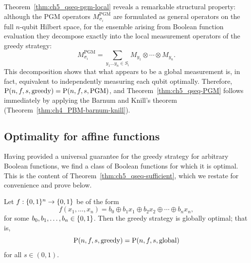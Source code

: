 Theorem~\ref{thm:ch5_qseq-pgm-local} reveals a remarkable structural property: although the PGM operators $M_{\sigma_i}^{\text{PGM}}$ are formulated as general operators on the full $n$-qubit Hilbert space, for the ensemble arising from Boolean function evaluation they decompose exactly into the local measurement operators of the greedy strategy:
\begin{equation}
    M_{\sigma_i}^{\text{PGM}} = \sum_{y_1 \ldots y_n \in S_i} M_{y_1} \otimes \cdots \otimes M_{y_n}.
\end{equation}
This decomposition shows that what appears to be a global measurement is, in fact, equivalent to independently measuring each qubit optimally.
Therefore, \\ $\operatorname{P}(n,f,s,\mathrm{greedy}) = \operatorname{P}(n,f,s,\mathrm{PGM})$, and Theorem~\ref{thm:ch5_qseq-PGM} follows immediately by applying the Barnum and Knill's theorem (Theorem~\ref{thm:ch4_PBM-barnum-knill}).


\subsection{Optimality for affine functions}\label{subsec:ch5_qseq-greedy=opt}

Having provided a universal guarantee for the greedy strategy for arbitrary Boolean functions, we find a class of Boolean functions for which it is optimal.
This is the content of Theorem~\ref{thm:ch5_qseq-sufficient}, which we restate for convenience and prove below.
\begin{sufficientrestate}[Sufficiency]
    Let $f : \{ 0, 1 \}^n \to \{ 0, 1 \}$ be of the form
    \[
        f(x_1,\ldots,x_n)
        =
        b_0 \oplus b_1x_1 \oplus b_2x_2
        \oplus \cdots \oplus b_nx_n,
    \]
    for some $b_0,b_1,\ldots,b_n\in\{ 0, 1 \}$.
    Then the greedy strategy is globally optimal; that is,
    \[
        \operatorname{P}(n,f,s,\mathrm{greedy})=\operatorname{P}(n,f,s,\mathrm{global})
    \]
    for all $s\in(0,1)$.
\end{sufficientrestate}

